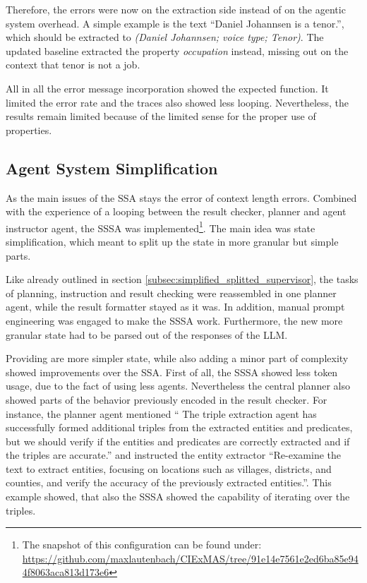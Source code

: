 \documentclass[a4paper,oneside,bibliography=totoc]{scrbook}
\begin{document}
Therefore, the errors were now on the extraction side instead of on the agentic system overhead. A simple example is the text \enquote{Daniel Johannsen is a tenor.}, which should be extracted to \textit{(Daniel Johannsen; voice type; Tenor)}. The updated baseline extracted the property \textit{occupation} instead, missing out on the context that tenor is not a job.

All in all the error message incorporation showed the expected function. It limited the error rate and the traces also showed less looping. Nevertheless, the results remain limited because of the limited sense for the proper use of properties.

\subsection{Agent System Simplification}
\label{subsec:task_simplification_state_refinement}

As the main issues of the \ac{SSA} stays the error of context length errors. Combined with the experience of a looping between the result checker, planner and agent instructor agent, the \ac{SSSA} was implemented\footnote{The snapshot of this configuration can be found under: \url{https://github.com/maxlautenbach/CIExMAS/tree/91e14e7561e2ed6ba85e944f8063aca813d173e6}}. The main idea was state simplification, which meant to split up the state in more granular but simple parts.

Like already outlined in section \ref{subsec:simplified_splitted_supervisor}, the tasks of planning, instruction and result checking were reassembled in one planner agent, while the result formatter stayed as it was. In addition, manual prompt engineering was engaged to make the \ac{SSSA} work. Furthermore, the new more granular state had to be parsed out of the responses of the \ac{LLM}.

Providing are more simpler state, while also adding a minor part of complexity showed improvements over the \ac{SSA}. First of all, the \ac{SSSA} showed less token usage, due to the fact of using less agents. Nevertheless the central planner also showed parts of the behavior previously encoded in the result checker. For instance, the planner agent mentioned \enquote{
  The triple extraction agent has successfully formed additional triples from the extracted entities and predicates, but we should verify if the entities and predicates are correctly extracted and if the triples are accurate.} and instructed the entity extractor \enquote{Re-examine the text to extract entities, focusing on locations such as villages, districts, and counties, and verify the accuracy of the previously extracted entities.}. This example showed, that also the \ac{SSSA} showed the capability of iterating over the triples.
\end{document}
